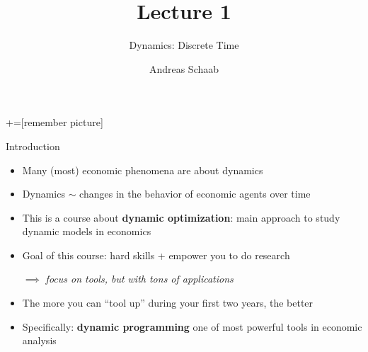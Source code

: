 \documentclass[10pt]{beamer}
\title{\large Lecture 1}
\subtitle{Dynamics: Discrete Time}
\author{Andreas Schaab}
\date{}
\begin{document}
+=[remember picture]
\thispagestyle{empty}
\maketitle 
\newpage

\addtocounter{framenumber}{-1}



\begin{frame}{Introduction}
\begin{itemize}
\item Many (most) economic phenomena are about dynamics

\item Dynamics $\sim$ changes in the behavior of economic agents over time

\item This is a course about \textbf{dynamic optimization}: main approach to study dynamic models in economics 

\item Goal of this course: hard skills + empower you to do research

$\implies$ \textit{focus on tools, but with tons of applications }

\item The more you can ``tool up'' during your first two years, the better

\item Specifically: \textbf{dynamic programming} one of most powerful tools in economic analysis

\end{itemize}
\end{frame}
\end{document}
